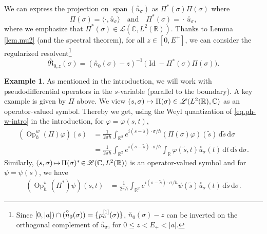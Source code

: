 \documentclass[JEP,XML,SOM,Unicode,NoFloatCountersInSection,published]{cedram}
\newcommand\mto{\mathchoice{\longmapsto}{\mapsto}{\mapsto}{\mapsto}}
\newcommand{\rd}{\,\mathrm{d}}
\DeclareMathOperator{\Id}{Id}
\DeclareMathOperator{\Op}{Op}
\let\sp\relax
\DeclareMathOperator{\sp}{sp}
\DeclareMathOperator{\Span}{span}
\theoremstyle{plain}
\theoremstyle{definition}
\newtheorem{example}[theorem]{Example}
\newcommand{\R}{\mathbb{R}}
\newcommand{\C}{\mathbb{C}}
\begin{document}
We can express the projection on $\Span(\overset{\circ}{u}_\sigma)$ as $ \Pi^*(\sigma)\Pi(\sigma)$ where
\[
\Pi(\sigma)=\langle\cdot,\overset{\circ}{u}_{\sigma}\rangle\quad\text{and}\quad \Pi^*(\sigma)={}\cdot\, \overset{\circ}{u}_{\sigma},
\]
where we emphasize that $\Pi^*(\sigma)\in\mathcal L (\mathbb C, L^2(\mathbb R))$.
Thanks to Lemma \ref{lem.mu2} (and the spectral theorem), for all $z\in [0,E^+]$, we can consider the regularized resolvent\footnote{Since $[0,|a|)\cap\sp(\overset{\circ}{n}_0(\sigma))=\{\mu_a^{[1]}(\sigma)\}$, $\overset{\circ}{n}_0(\sigma)-z$ can be inverted on the orthogonal complement of $\overset{\circ}{u}_\sigma$, for $0\leq z<E_+<|a|$.}
\[
\overset{\circ}{\mathfrak R}_{0,z}(\sigma)= (\overset{\circ}{n}_0(\sigma)-z)^{-1}\,\bigl(\Id-\Pi^*(\sigma)\Pi(\sigma)\bigr).
\]

\begin{example}
As mentioned in the introduction, we will work with pseudodifferential operators in the $s$-variable (parallel to the boundary).
A key example is given by $\Pi$ above. We view $(s,\sigma) \mto \Pi(\sigma) \in \mathscr{L}(L^2(\R),\C)$ as an operator-valued symbol.
Thereby we get, using the Weyl quantization of \eqref{eq.ph-w-intro} in the introduction, for $\varphi=\varphi(s,t)$,
\begin{align*}
(\Op_\hbar^w(\Pi) \varphi)(s)&=\frac{1}{2\pi\hbar} \int_{\R^2} e^{i(s-\tilde s)\cdot \sigma/\hbar} (\Pi(\sigma) \varphi)(\tilde s) \rd \tilde s \rd \sigma \\
&= \frac{1}{2\pi\hbar} \int_{\R^2} e^{i(s-\tilde s)\cdot \sigma/\hbar} \int_{\R} \varphi(\tilde s,t) \overline{\overset{\circ}{u}_\sigma(t)} \rd t \rd \tilde s \rd \sigma.
\end{align*}
Similarly, $(s,\sigma) \!\mto\! \Pi(\sigma)^{*} \!\in\! \mathscr{L}(\C,L^2(\R))$ is an operator-valued symbol and for \hbox{$\psi\!=\!\psi(s)$}, we have\vspace*{-3pt}
\begin{align*}
(\Op_\hbar^w(\Pi^{*}) \psi)(s,t)
&= \frac{1}{2\pi\hbar} \int_{\R^2} e^{i(s-\tilde s)\cdot \sigma/\hbar}\psi(\tilde s) \overset{\circ}{u}_\sigma(t) \rd \tilde s \rd \sigma.
\end{align*}
\end{example}
\end{document}
